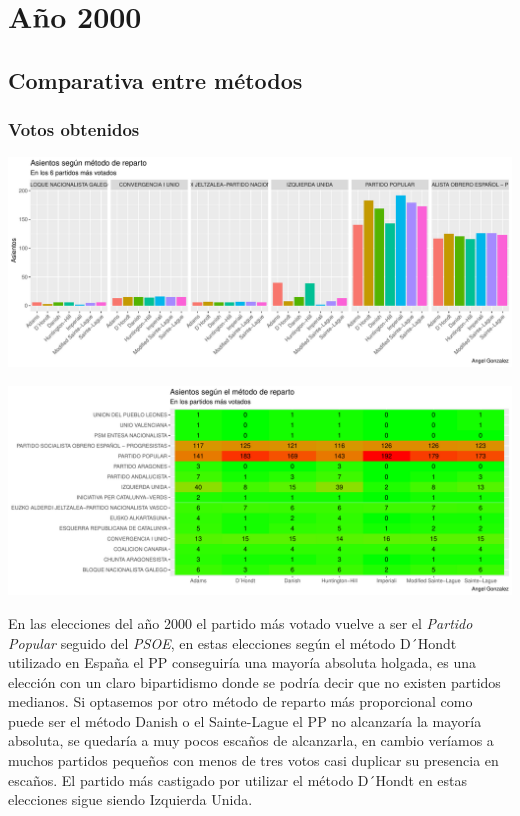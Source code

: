 \documentclass[12pt,a4paper,]{book}
\numberwithin{dummy}{section}
\theoremstyle{ocrenumbox}
\theoremstyle{blacknumex}
\theoremstyle{blacknumbox}
\theoremstyle{ocrenum}
\theoremstyle{ocrenum}
\begin{document}
\hypertarget{auxf1o-2000}{%
\section{Año 2000}\label{auxf1o-2000}}

\hypertarget{comparativa-entre-muxe9todos-7}{%
\subsection{Comparativa entre
métodos}\label{comparativa-entre-muxe9todos-7}}

\hypertarget{votos-obtenidos-7}{%
\subsubsection{Votos obtenidos}\label{votos-obtenidos-7}}

\begin{center}\includegraphics[width=0.95\linewidth]{figurasR/unnamed-chunk-122-1} \end{center}

\begin{center}\includegraphics[width=0.95\linewidth]{figurasR/unnamed-chunk-122-2} \end{center}

En las elecciones del año 2000 el partido más votado vuelve a ser el
\emph{Partido Popular} seguido del \emph{PSOE}, en estas elecciones
según el método D´Hondt utilizado en España el PP conseguiría una
mayoría absoluta holgada, es una elección con un claro bipartidismo
donde se podría decir que no existen partidos medianos. Si optasemos por
otro método de reparto más proporcional como puede ser el método Danish
o el Sainte-Lague el PP no alcanzaría la mayoría absoluta, se quedaría a
muy pocos escaños de alcanzarla, en cambio veríamos a muchos partidos
pequeños con menos de tres votos casi duplicar su presencia en escaños.
El partido más castigado por utilizar el método D´Hondt en estas
elecciones sigue siendo Izquierda Unida.
\end{document}
